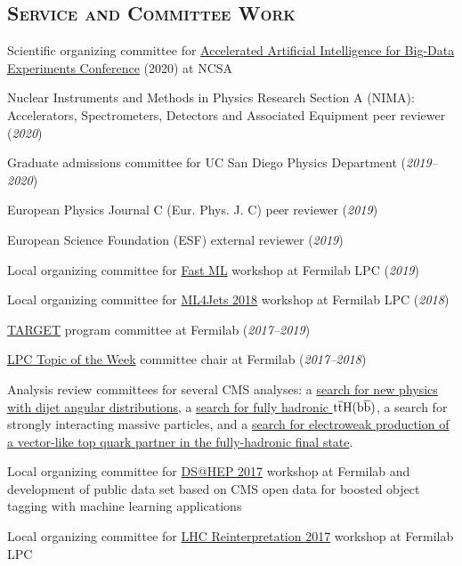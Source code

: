 \documentclass[12pt]{res}
\newcommand{\MarginText}[1]{\section{\textsc{#1}}\vspace{10pt}}
\begin{document}
\begin{resume}
\MarginText{Service and Committee Work}

Scientific organizing committee for \href{http://www.ncsa.illinois.edu/Conferences/AcceleratedAINCSA/}{Accelerated Artificial Intelligence for Big-Data Experiments Conference} (2020) at NCSA

Nuclear Instruments and Methods in Physics Research Section A (NIMA): Accelerators, Spectrometers, Detectors and Associated Equipment peer reviewer (\textit{2020})

Graduate admissions committee for UC San Diego Physics Department (\textit{2019--2020})

European Physics Journal C (Eur. Phys. J. C) peer reviewer (\textit{2019})

European Science Foundation (ESF) external reviewer (\textit{2019})

Local organizing committee for \href{https://indico.cern.ch/e/fml}{Fast ML} workshop at Fermilab LPC (\textit{2019})

Local organizing committee for \href{https://indico.cern.ch/e/ml4jets2018}{ML4Jets 2018} workshop at Fermilab LPC (\textit{2018})

\href{http://diversity.fnal.gov/target/}{TARGET} program committee at Fermilab (\textit{2017--2019})

\href{http://lpc.fnal.gov/programs/topic/}{LPC Topic of the Week} committee chair at Fermilab (\textit{2017--2018})

Analysis review committees for several CMS analyses: a \href{http://arxiv.org/abs/1803.08030}{search for new physics with dijet angular distributions}, a \href{https://arxiv.org/abs/1803.06986}{search for fully hadronic $\mathrm{t}\overline{\mathrm{t}}\mathrm{H}(\mathrm{b}\overline{\mathrm{b}})$}, a search for strongly interacting massive particles, and a \href{https://arxiv.org/abs/1909.04721}{search for electroweak production of a vector-like top quark partner in the fully-hadronic final state}.

Local organizing committee for \href{http://dshep.fnal.gov}{DS@HEP 2017} workshop at Fermilab and development of public data set based on CMS open data for boosted object tagging with machine learning applications

Local organizing committee for \href{https://indico.cern.ch/event/639314/}{LHC Reinterpretation 2017} workshop at Fermilab LPC



\end{resume}
\end{document}
